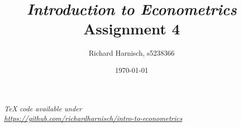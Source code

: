 \documentclass[a4paper]{article}
\begin{document}
\title{\textit{Introduction to Econometrics}\\Assignment 4}
\author{Richard Harnisch, s5238366}
\date{\today}
\maketitle

\makeatletter
\newcommand{\answer}[1]{%
    \par\medskip
    \noindent
    \hspace*{-\@totalleftmargin}%
    \fbox{%
        \parbox{\dimexpr\textwidth-2\fboxsep-2\fboxrule}{#1}%
    }%
    \par\medskip
}
\makeatother

\noindent\textit{TeX code available under\\ \url{https://github.com/richardharnisch/intro-to-econometrics}}
\end{document}
